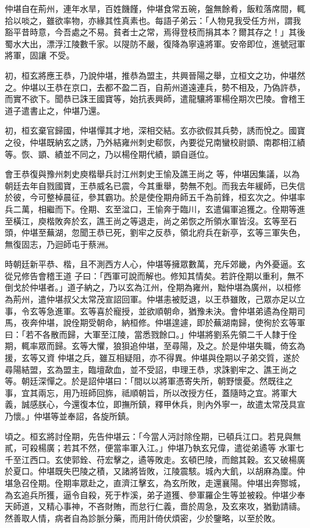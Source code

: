 \begin{pinyinscope}
 仲堪自在荊州，連年水旱，百姓饑饉，仲堪食常五碗，盤無餘肴，飯粒落席間，輒拾以啖之，雖欲率物，亦緣其性真素也。每語子弟云：「人物見我受任方州，謂我豁平昔時意，今吾處之不易。貧者士之常，焉得登枝而捐其本？爾其存之！」其後蜀水大出，漂浮江陵數千家。以隄防不嚴，復降為寧遠將軍。安帝即位，進號冠軍將軍，固讓
 不受。



 初，桓玄將應王恭，乃說仲堪，推恭為盟主，共興晉陽之舉，立桓文之功，仲堪然之。仲堪以王恭在京口，去都不盈二百，自荊州道遠連兵，勢不相及，乃偽許恭，而實不欲下。聞恭已誅王國寶等，始抗表興師，遣龍驤將軍楊佺期次巴陵。會稽王道子遣書止之，仲堪乃還。



 初，桓玄棄官歸國，仲堪憚其才地，深相交結。玄亦欲假其兵勢，誘而悅之。國寶之役，仲堪既納玄之誘，乃外結雍州刺史郗恢，內要從兄南蠻校尉顗、南郡相江績等。恢、顗、績並不同之，乃以楊佺期代績，顗自遜位。



 會王恭復與豫州刺史庾楷舉兵討江州刺史王愉及譙王尚之
 等，仲堪因集議，以為朝廷去年自戮國寶，王恭威名已震，今其重舉，勢無不剋。而我去年緩師，已失信於彼，今可整棹晨征，參其霸功。於是使佺期舟師五千為前鋒，桓玄次之。仲堪率兵二萬，相繼而下。佺期、玄至湓口，王愉奔于臨川，玄遣偏軍追獲之。佺期等進至橫江，庾楷敗奔於玄，譙王尚之等退走，尚之弟恢之所領水軍皆沒。玄等至石頭，仲堪至蕪湖，忽聞王恭已死，劉牢之反恭，領北府兵在新亭，玄等三軍失色，無復固志，乃迴師屯于蔡洲。



 時朝廷新平恭、楷，且不測西方人心，仲堪等擁眾數萬，充斥郊畿，內外憂逼。玄從兄修告會稽王道
 子曰：「西軍可說而解也。修知其情矣。若許佺期以重利，無不倒戈於仲堪者。」道子納之，乃以玄為江州，佺期為雍州，黜仲堪為廣州，以桓修為荊州，遣仲堪叔父太常茂宣詔回軍。仲堪恚被貶退，以王恭雖敗，己眾亦足以立事，令玄等急進軍。玄等喜於寵授，並欲順朝命，猶豫未決。會仲堪弟遹為佺期司馬，夜奔仲堪，說佺期受朝命，納桓修。仲堪遑遽，即於蕪湖南歸，使徇於玄等軍曰：「若不各散而歸，大軍至江陵，當悉戮餘口。」仲堪將劉系先領二千人隸于佺期，輒率眾而歸。玄等大懼，狼狽追仲堪，至尋陽，及之。於是仲堪失職，倚玄為援，玄等又資
 仲堪之兵，雖互相疑阻，亦不得異。仲堪與佺期以子弟交質，遂於尋陽結盟，玄為盟主，臨壇歃血，並不受詔，申理王恭，求誅劉牢之、譙王尚之等。朝廷深憚之。於是詔仲堪曰：「間以以將軍憑寄失所，朝野懷憂。然既往之事，宜其兩忘，用乃班師回旆，祗順朝旨，所以改授方任，蓋隨時之宜。將軍大義，誠感朕心，今還復本位，即撫所鎮，釋甲休兵，則內外寧一，故遣太常茂具宣乃懷。」仲堪等並奉詔，各旋所鎮。



 頃之。桓玄將討佺期，先告仲堪云：「今當人沔討除佺期，已頓兵江口。若見與無貳，可殺楊廣；若其不然，便當率軍入江。」仲堪乃執玄兄偉，遣從弟遹等
 水軍七千至江西口。玄使郭銓、苻宏擊之，遹等敗走。玄頓巴陵，而館其穀。玄又破楊廣於夏口。仲堪既失巴陵之積，又諸將皆敗，江陵震駭。城內大飢，以胡麻為廩。仲堪急召佺期。佺期率眾赴之，直濟江擊玄，為玄所敗，走還襄陽。仲堪出奔酂城，為玄追兵所獲，逼令自殺，死于柞溪，弟子道獲、參軍羅企生等並被殺。仲堪少奉天師道，又精心事神，不吝財賄，而怠行仁義，嗇於周急，及玄來攻，猶勤請禱。然善取人情，病者自為診脈分藥，而用計倚伏煩密，少於鑒略，以至於敗。




\end{pinyinscope}
